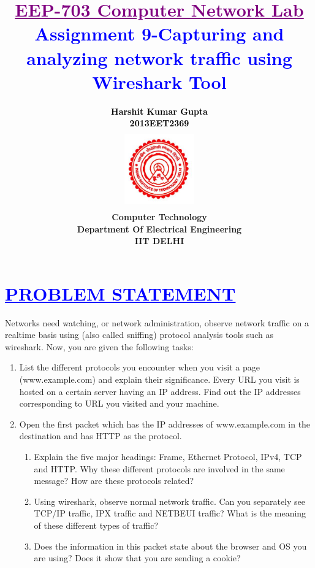 \documentclass[a4paper,12pt]{report}
\title{\bfseries\huge \textcolor{purple}{\underline {EEP-703 Computer Network Lab}} \\{\textcolor{blue}{Assignment 9-Capturing and analyzing network traffic
using Wireshark Tool}}}
\author{\bfseries\large\textcolor{black}  {Harshit Kumar Gupta}\\ {\textcolor{black} {2013EET2369 }}\\
\includegraphics[width=3cm,height=3.4cm]{./iit.png}\\\noindent Computer Technology\\
\noindent Department Of Electrical Engineering\\IIT DELHI}
\begin{document}
\maketitle
\tableofcontents



\chapter{\textcolor{blue}{\underline {PROBLEM STATEMENT}}}
\noindent 
Networks need watching, or network administration, observe network traffic on a real­time basis using (also called 
sniffing)  protocol analysis tools such as wireshark.
 Now, you are given the following tasks:
  \begin{enumerate}

\item List the different protocols you encounter when you visit a page (www.example.com) and 
explain their significance. Every URL you visit is hosted on a certain server having an IP 
address. Find out the IP addresses corresponding to URL you visited and your machine.
\item  Open the first packet which has the IP addresses of www.example.com in the 
destination and has HTTP as the protocol.
\begin{enumerate}
 \item  Explain the five major headings: Frame, Ethernet Protocol, IPv4, TCP and HTTP. 
Why these different protocols are involved in the same message? How are these 
protocols related? 
\item Using wireshark, observe normal network traffic. Can you separately see TCP/IP traffic, 
    IPX traffic and NETBEUI traffic? What is the meaning of these different types of traffic?
\item Does the information in this packet state about the browser and OS you are 
using?  Does it show that you are sending a cookie? 
\end{enumerate}

\end{enumerate}
\end{document}
